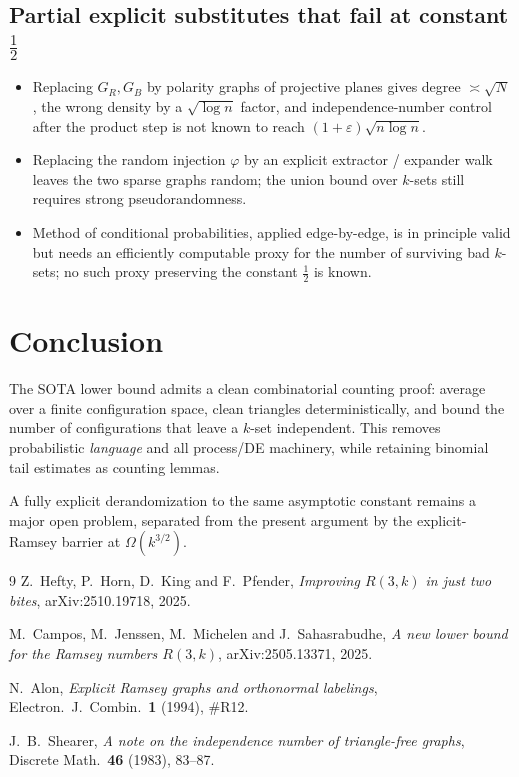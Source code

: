 \documentclass[11pt]{article}
\theoremstyle{definition}
\newcommand{\eps}{\varepsilon}
\begin{document}
\subsection{Partial explicit substitutes that fail at constant $\tfrac12$}

\begin{itemize}
  \item Replacing $G_{R},G_{B}$ by polarity graphs of projective planes gives degree $\asymp\sqrt{N}$, the wrong density by a $\sqrt{\log n}$ factor, and independence-number control after the product step is not known to reach $(1+\eps)\sqrt{n\log n}$.
  \item Replacing the random injection $\varphi$ by an explicit extractor / expander walk leaves the two sparse graphs random; the union bound over $k$-sets still requires strong pseudorandomness.
  \item Method of conditional probabilities, applied edge-by-edge, is in principle valid but needs an efficiently computable proxy for the number of surviving bad $k$-sets; no such proxy preserving the constant $\tfrac12$ is known.
\end{itemize}

\section{Conclusion}

The SOTA lower bound admits a clean combinatorial counting proof: average over a finite configuration space, clean triangles deterministically, and bound the number of configurations that leave a $k$-set independent.
This removes probabilistic \emph{language} and all process/DE machinery, while retaining binomial tail estimates as counting lemmas.

A fully explicit derandomization to the same asymptotic constant remains a major open problem, separated from the present argument by the explicit-Ramsey barrier at $\Omega(k^{3/2})$.

\begin{thebibliography}{9}
Z.~Hefty, P.~Horn, D.~King and F.~Pfender,
\emph{Improving $R(3,k)$ in just two bites},
arXiv:2510.19718, 2025.

M.~Campos, M.~Jenssen, M.~Michelen and J.~Sahasrabudhe,
\emph{A new lower bound for the Ramsey numbers $R(3,k)$},
arXiv:2505.13371, 2025.

N.~Alon,
\emph{Explicit Ramsey graphs and orthonormal labelings},
Electron.\ J.\ Combin.\ \textbf{1} (1994), \#R12.

J.~B.~Shearer,
\emph{A note on the independence number of triangle-free graphs},
Discrete Math.\ \textbf{46} (1983), 83--87.
\end{thebibliography}
\end{document}
